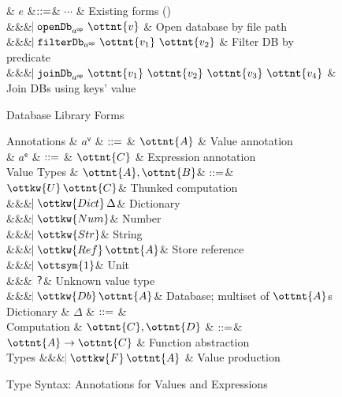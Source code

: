 \begin{figure}
  \begin{grammar}
  & $e$
    &$\mathrel{::=}$& $\cdots$ & Existing forms ()
    \\ &&& $\bnfaltbrk  \texttt{openDb}_{ a^{\textsf{op} } }~ \ottnt{v} $ & Open database by file path
    \\ &&& $\bnfaltbrk  \texttt{filterDb}_{ a^{\textsf{op} } }~ \ottnt{v_{{\mathrm{1}}}} ~ \ottnt{v_{{\mathrm{2}}}} $ & Filter DB by predicate
    \\ &&& $\bnfaltbrk  \texttt{joinDb}_{ a^{\textsf{op} } }~ \ottnt{v_{{\mathrm{1}}}} ~ \ottnt{v_{{\mathrm{2}}}} ~ \ottnt{v_{{\mathrm{3}}}} ~ \ottnt{v_{{\mathrm{4}}}} $ & Join DBs using keys' value
\end{grammar}
\caption{Database Library Forms}
\label{fig:db-syntax}
\end{figure}


\begin{figure}
\begin{grammar}
  Annotations
    & $a^\textsf{v}$ & $\mathrel{::=}$ & $\ottnt{A}$ & Value annotation
  \\
    & $a^\textsf{e}$ & $\mathrel{::=}$ & $\ottnt{C}$ & Expression annotation
  \\
  Value Types  & $\ottnt{A}, \ottnt{B}$& $\mathrel{::=}$& 
  $ \ottkw{U} \, \ottnt{C}$& Thunked computation
  \\ &&& $\bnfaltbrk \ottkw{Dict} \, \Delta$& Dictionary
  \\ &&& $\bnfaltbrk \ottkw{Num}$& Number
  \\ &&& $\bnfaltbrk \ottkw{Str}$& String
  \\ &&& $\bnfaltbrk \ottkw{Ref} \, \ottnt{A}$& Store reference
  \\ &&& $\bnfaltbrk \ottsym{1}$& Unit
  \\ &&& $\hspace{-1.02ex}\mathrel{\mid}  \textsf{?} $& Unknown value type
  \\ &&& $\bnfaltbrk \ottkw{Db} \, \ottnt{A}$& Database; multiset of $\ottnt{A}$s
  \\[2mm]
  Dictionary & $\Delta$ & $\mathrel{::=}$ & 
  \\[2mm]
  Computation & $\ottnt{C}, \ottnt{D}$ & $\mathrel{::=}$& 
  $\ottnt{A}  \rightarrow  \ottnt{C}$ & Function abstraction
  \\ 
  Types
  &&& $\bnfaltbrk \ottkw{F} \, \ottnt{A}$ & Value production
\end{grammar}
\caption{Type Syntax: Annotations for Values and Expressions}
\label{fig:types}
\end{figure}

